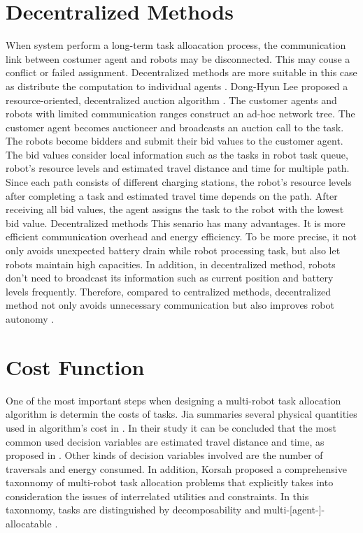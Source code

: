 \section{Decentralized Methods}
When system perform a long-term task alloacation process, the communication link between costumer agent and robots may be disconnected. This may couse a conflict or failed assignment. Decentralized methods are more suitable in this case as distribute the computation to individual agents \cite{NUNES201755}.  Dong-Hyun Lee proposed a resource-oriented, decentralized auction algorithm \cite{Dong2015}. 
The customer agents and robots with limited communication ranges construct an ad-hoc network tree. The customer agent becomes auctioneer and broadcasts an auction call to the task. The robots become bidders and submit their bid values to the customer agent. The bid values consider local information such as the tasks in robot task queue, robot's resource levels and estimated travel distance and time for multiple path. 
Since each path consists of different charging stations, the robot's resource levels after completing a task and estimated travel time depends on the path. 
After receiving all bid values, the agent assigns the task to the robot with the lowest bid value. Decentralized methods
This senario has many advantages. It is more efficient communication overhead and energy efficiency. To be more precise, it not only avoids unexpected battery drain while robot processing task, but also let robots maintain high capacities. In addition, in decentralized method, robots don't need to broadcast its information such as current position and battery levels frequently. Therefore, compared to centralized methods, decentralized method not only avoids unnecessary communication but also improves robot autonomy \cite{Shah07}.

\section{Cost Function}
One of the most important steps when designing a multi-robot task allocation algorithm is determin the costs of tasks. Jia summaries several physical quantities used in algorithm's cost in \cite{Jia2013ASA}. In their study it can be concluded that the most common used decision variables are estimated travel distance and time, as proposed in \cite{Dong2015}. Other kinds of decision variables involved are the number of traversals and energy consumed. 
In addition, Korsah proposed a comprehensive taxonnomy of multi-robot task allocation problems that explicitly takes into consideration the issues of interrelated utilities and constraints. In this taxonnomy, tasks are distinguished by decomposability and multi-[agent-]-allocatable \cite{Korsah13}.
